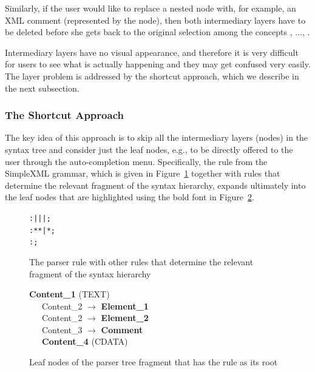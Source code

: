 Similarly, if the user would like to replace a nested  node with, for example, an XML comment (represented by the  node), then both intermediary layers have to be deleted before she gets back to the original selection among the concepts , $\ldots$, .

Intermediary layers have no visual appearance, and therefore it is very difficult for users to see what is actually happening and they may get confused very easily.
The layer problem is addressed by the shortcut approach, which we describe in the next subsection.

\subsubsection{The Shortcut Approach}
\label{sect:SHORTCUT}

The key idea of this approach is to skip all the intermediary layers (nodes) in the syntax tree and consider just the leaf nodes, e.g., to be directly offered to the user through the auto-completion menu.
Specifically, the  rule from the SimpleXML grammar, which is given in Figure~\ref{fig:CONTENTRULE} together with rules that determine the relevant fragment of the syntax hierarchy, expands ultimately into the leaf nodes that are highlighted using the bold font in Figure~\ref{fig:CONTENTEXPAND}.

\begin{figure}[ht]
\centering
\begin{framed}
\begin{alltt}
   :  |  |  |  ;
   : \antlrliteral{<}  * \antlrliteral{>} * \antlrliteral{</}  \antlrliteral{>} | \antlrliteral{<}  * \antlrliteral{/>} ;
   : \antlrliteral{<!--}  \antlrliteral{-->} ;
\end{alltt}
\end{framed}
\caption{The parser rule  with other rules that determine the relevant fragment of the syntax hierarchy}
\label{fig:CONTENTRULE}
\end{figure}

\begin{figure}[ht]
\begin{framed}
\textbf{Content{\_}1} (TEXT) \\
\ \ \ Content{\_}2 $\rightarrow$ \textbf{Element{\_}1} \\
\ \ \ Content{\_}2 $\rightarrow$ \textbf{Element{\_}2} \\
\ \ \ Content{\_}3 $\rightarrow$ \textbf{Comment} \\
\ \ \ \textbf{Content{\_}4} (CDATA)
\end{framed}
\caption{Leaf nodes of the parser tree fragment that has the  rule as its root}
\label{fig:CONTENTEXPAND}
\end{figure}

